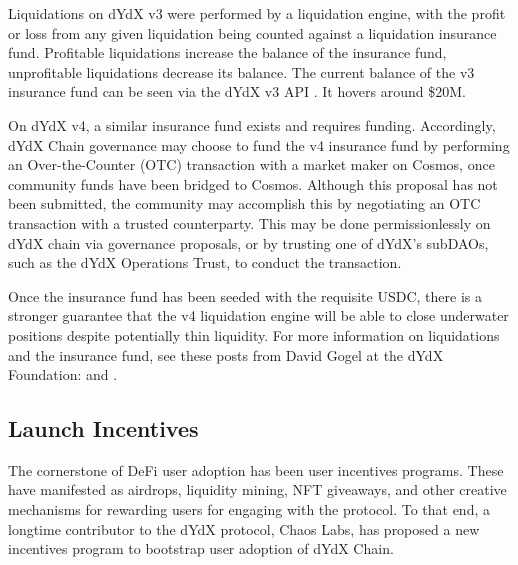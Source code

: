         Liquidations on dYdX v3 were performed by a liquidation engine, with the profit or loss from any given liquidation being counted against a liquidation insurance fund. Profitable liquidations increase the balance of the insurance fund, unprofitable liquidations decrease its balance. The current balance of the v3 insurance fund can be seen via the dYdX v3 API . It hovers around \$20M.

        On dYdX v4, a similar insurance fund exists and requires funding. Accordingly, dYdX Chain governance may choose to fund the v4 insurance fund by performing an Over-the-Counter (OTC) transaction with a market maker on Cosmos, once community funds have been bridged to Cosmos. Although this proposal has not been submitted, the community may accomplish this by negotiating an OTC transaction with a trusted counterparty. This may be done permissionlessly on dYdX chain via governance proposals, or by trusting one of dYdX's subDAOs, such as the dYdX Operations Trust, to conduct the transaction.

        Once the insurance fund has been seeded with the requisite USDC, there is a stronger guarantee that the v4 liquidation engine will be able to close underwater positions despite potentially thin liquidity. For more information on liquidations and the insurance fund, see these posts from David Gogel at the dYdX Foundation:  and .

    \subsection{Launch Incentives}

        The cornerstone of DeFi user adoption has been user incentives programs. These have manifested as airdrops, liquidity mining, NFT giveaways, and other creative mechanisms for rewarding users for engaging with the protocol. To that end, a longtime contributor to the dYdX protocol, Chaos Labs, has proposed a new incentives program to bootstrap user adoption of dYdX Chain. 

